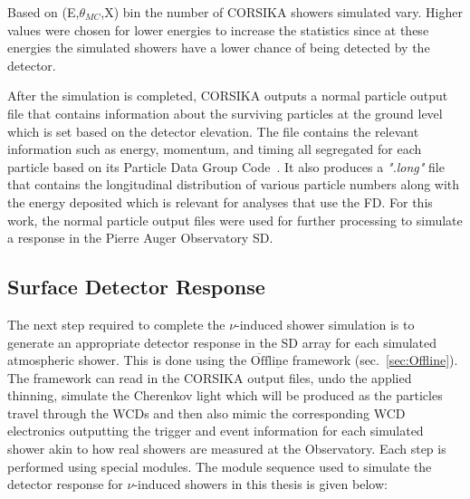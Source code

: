 Based on (E,$\theta_{MC}$,X) bin the number of CORSIKA showers simulated vary. Higher values were chosen for lower energies to increase the statistics since at these energies the simulated showers have a lower chance of being detected by the detector.  

After the simulation is completed, CORSIKA outputs a normal particle output file that contains information about the surviving particles at the ground level which is set based on the detector elevation. The file contains the relevant information such as energy, momentum, and timing all segregated for each particle based on its Particle Data Group Code~\cite{ParticleDataGroup:2024cfk}. It also produces a \textit{".long"} file that contains the longitudinal distribution of various particle numbers along with the energy deposited which is relevant for analyses that use the FD. For this work, the normal particle output files were used for further processing to simulate a response in the Pierre Auger Observatory SD.

\subsection{Surface Detector Response}
\label{subsec:sim_SD_resp}

The next step required to complete the $\nu$-induced shower simulation is to generate an appropriate detector response in the SD array for each simulated atmospheric shower. This is done using the $\mathrm{\overline{Off}\underline{line}}$ framework (sec.~\ref{sec:Offline}). The framework can read in the CORSIKA output files, undo the applied thinning, simulate the Cherenkov light which will be produced as the particles travel through the WCDs and then also mimic the corresponding WCD electronics outputting the trigger and event information for each simulated shower akin to how real showers are measured at the Observatory. Each step is performed using special modules. The module sequence used to simulate the detector response for $\nu$-induced showers in this thesis is given below: 


